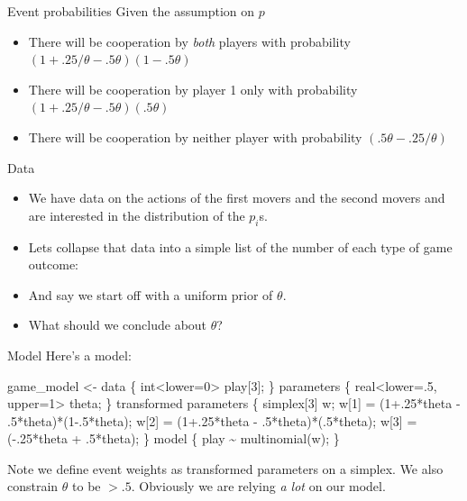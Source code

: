 \documentclass[
  11pt,
  ignorenonframetext,
]{beamer}
\newenvironment{Shaded}{\begin{snugshade}}{\end{snugshade}}
\newcommand{\NormalTok}[1]{\textcolor[rgb]{0.00,0.23,0.31}{#1}}
\newcommand{\OtherTok}[1]{\textcolor[rgb]{0.00,0.23,0.31}{#1}}
\newcommand{\StringTok}[1]{\textcolor[rgb]{0.13,0.47,0.30}{#1}}
\providecommand{\tightlist}{%
  \setlength{\itemsep}{0pt}\setlength{\parskip}{0pt}}\usepackage{longtable,booktabs,array}
\begin{document}
\begin{frame}{Event probabilities}
\protect\hypertarget{event-probabilities-1}{}
Given the assumption on \(p\)

\begin{itemize}
\tightlist
\item
  There will be cooperation by \emph{both} players with probability
  \((1+.25/\theta -.5\theta)(1-.5\theta)\)
\item
  There will be cooperation by player 1 only with probability
  \((1+.25/\theta -.5\theta)(.5\theta)\)
\item
  There will be cooperation by neither player with probability
  \((.5\theta-.25/\theta)\)
\end{itemize}
\end{frame}

\begin{frame}{Data}
\protect\hypertarget{data}{}
\begin{itemize}
\item
  We have data on the actions of the first movers and the second movers
  and are interested in the distribution of the \(p_i\)s.
\item
  Lets collapse that data into a simple list of the number of each type
  of game outcome:
\item
  And say we start off with a uniform prior of \(\theta\).
\item
  What should we conclude about \(\theta\)?
\end{itemize}
\end{frame}

\begin{frame}[fragile]{Model}
\protect\hypertarget{model-1}{}
Here's a model:

\tiny

\begin{Shaded}
\begin{Highlighting}[]
\NormalTok{game\_model }\OtherTok{\textless{}{-}} \StringTok{\textquotesingle{}}
\StringTok{data \{}
\StringTok{  int\textless{}lower=0\textgreater{} play[3];}
\StringTok{\}}
\StringTok{parameters \{}
\StringTok{  real\textless{}lower=.5, upper=1\textgreater{} theta;}
\StringTok{\}}
\StringTok{transformed parameters \{}
\StringTok{simplex[3] w;}
\StringTok{ w[1] = (1+.25*theta {-} .5*theta)*(1{-}.5*theta);}
\StringTok{ w[2] = (1+.25*theta {-} .5*theta)*(.5*theta);}
\StringTok{ w[3] = ({-}.25*theta  + .5*theta);}
\StringTok{\}}
\StringTok{model \{}
\StringTok{  play \textasciitilde{} multinomial(w);}
\StringTok{\}}
\StringTok{\textquotesingle{}}
\end{Highlighting}
\end{Shaded}

Note we define event weights as transformed parameters on a simplex. We
also constrain \(\theta\) to be \(>.5\). Obviously we are relying
\emph{a lot} on our model.
\end{frame}
\end{document}
